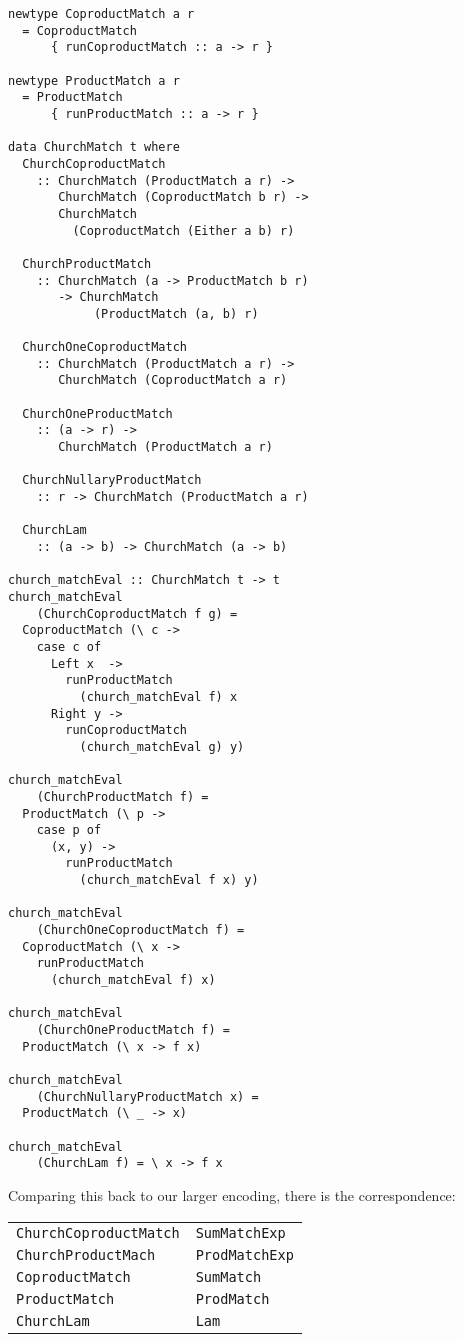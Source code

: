 \documentclass[sigplan,anonymous,review]{acmart}
\newcommand{\ttt}{\texttt}
\begin{document}
\begin{lstlisting}
newtype CoproductMatch a r
  = CoproductMatch
      { runCoproductMatch :: a -> r }

newtype ProductMatch a r
  = ProductMatch
      { runProductMatch :: a -> r }

data ChurchMatch t where
  ChurchCoproductMatch
    :: ChurchMatch (ProductMatch a r) ->
       ChurchMatch (CoproductMatch b r) ->
       ChurchMatch
         (CoproductMatch (Either a b) r)

  ChurchProductMatch
    :: ChurchMatch (a -> ProductMatch b r)
       -> ChurchMatch
            (ProductMatch (a, b) r)

  ChurchOneCoproductMatch
    :: ChurchMatch (ProductMatch a r) ->
       ChurchMatch (CoproductMatch a r)

  ChurchOneProductMatch
    :: (a -> r) ->
       ChurchMatch (ProductMatch a r)

  ChurchNullaryProductMatch
    :: r -> ChurchMatch (ProductMatch a r)

  ChurchLam
    :: (a -> b) -> ChurchMatch (a -> b)

church_matchEval :: ChurchMatch t -> t
church_matchEval
    (ChurchCoproductMatch f g) =
  CoproductMatch (\ c ->
    case c of
      Left x  ->
        runProductMatch
          (church_matchEval f) x
      Right y ->
        runCoproductMatch
          (church_matchEval g) y)

church_matchEval
    (ChurchProductMatch f) =
  ProductMatch (\ p ->
    case p of
      (x, y) ->
        runProductMatch
          (church_matchEval f x) y)

church_matchEval
    (ChurchOneCoproductMatch f) =
  CoproductMatch (\ x ->
    runProductMatch
      (church_matchEval f) x)

church_matchEval
    (ChurchOneProductMatch f) =
  ProductMatch (\ x -> f x)

church_matchEval
    (ChurchNullaryProductMatch x) =
  ProductMatch (\ _ -> x)

church_matchEval
    (ChurchLam f) = \ x -> f x
\end{lstlisting}

Comparing this back to our larger encoding, there is the correspondence: \\

\begin{tabular}{|l|l|}
  \hline
  \ttt{ChurchCoproductMatch} & \ttt{SumMatchExp} \\
  \ttt{ChurchProductMach} & \ttt{ProdMatchExp} \\
  \ttt{CoproductMatch} & \ttt{SumMatch} \\
  \ttt{ProductMatch} & \ttt{ProdMatch} \\
  \ttt{ChurchLam} & \ttt{Lam} \\
  \hline
\end{tabular} \\
\end{document}
